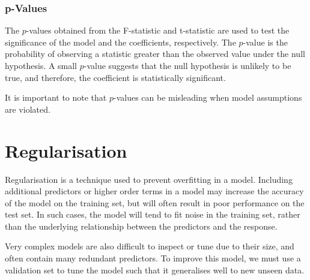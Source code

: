 \documentclass{article}
\begin{document}
\subsubsection{p-Values}
The \(p\)-values obtained from the F-statistic and t-statistic are used
to test the significance of the model and the coefficients,
respectively. The \(p\)-value is the probability of observing a
statistic greater than the observed value under the null hypothesis. A
small \(p\)-value suggests that the null hypothesis is unlikely to be
true, and therefore, the coefficient is statistically significant.

It is important to note that \(p\)-values can be misleading when model
assumptions are violated.
\section{Regularisation}
Regularisation is a technique used to prevent overfitting in a model.
Including additional predictors or higher order terms in a model may
increase the accuracy of the model on the training set, but will often
result in poor performance on the test set. In such cases, the model
will tend to fit noise in the training set, rather than the underlying
relationship between the predictors and the response.

Very complex models are also difficult to inspect or tune due to their
size, and often contain many redundant predictors. To improve this
model, we must use a validation set to tune the model such that it
generalises well to new unseen data.
\end{document}
